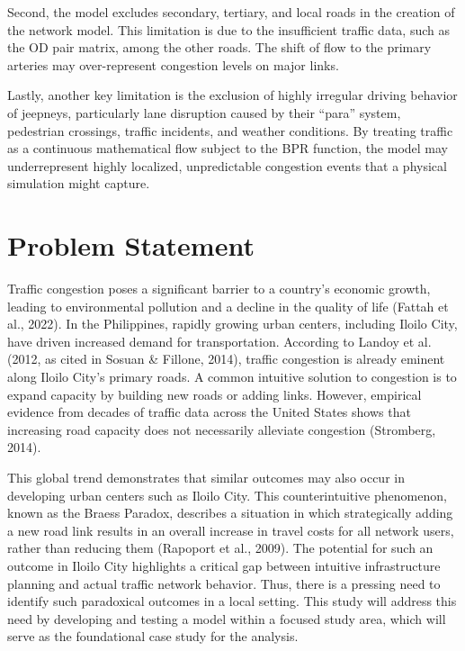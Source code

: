  Second, the model excludes secondary, tertiary, and local roads in the creation of the network model. This limitation is due to the insufficient traffic data, such as the OD pair matrix, among the other roads. The shift of flow to the primary arteries may over-represent congestion levels on major links.

 Lastly, another key limitation is the exclusion of highly irregular driving behavior of jeepneys, particularly lane disruption caused by their “para” system, pedestrian crossings, traffic incidents, and weather conditions. By treating traffic as a continuous mathematical flow subject to the BPR function, the model may underrepresent highly localized, unpredictable congestion events that a physical simulation might capture.

\section{Problem Statement}
\label{sec:problem_statement}

Traffic congestion poses a significant barrier to a country’s economic growth, leading to environmental pollution and a decline in the quality of life (Fattah et al., 2022). In the Philippines, rapidly growing urban centers, including Iloilo City, have driven increased demand for transportation. According to Landoy et al. (2012, as cited in Sosuan \& Fillone, 2014), traffic congestion is already eminent along Iloilo City’s primary roads. A common intuitive solution to congestion is to expand capacity by building new roads or adding links. However, empirical evidence from decades of traffic data across the United States shows that increasing road capacity does not necessarily alleviate congestion (Stromberg, 2014). 

This global trend demonstrates that similar outcomes may also occur in developing urban centers such as Iloilo City. This counterintuitive phenomenon, known as the Braess Paradox, describes a situation in which strategically adding a new road link results in an overall increase in travel costs for all network users, rather than reducing them (Rapoport et al., 2009). The potential for such an outcome in Iloilo City highlights a critical gap between intuitive infrastructure planning and actual traffic network behavior. Thus, there is a pressing need to identify such paradoxical outcomes in a local setting. This study will address this need by developing and testing a model within a focused study area, which will serve as the foundational case study for the analysis. 


